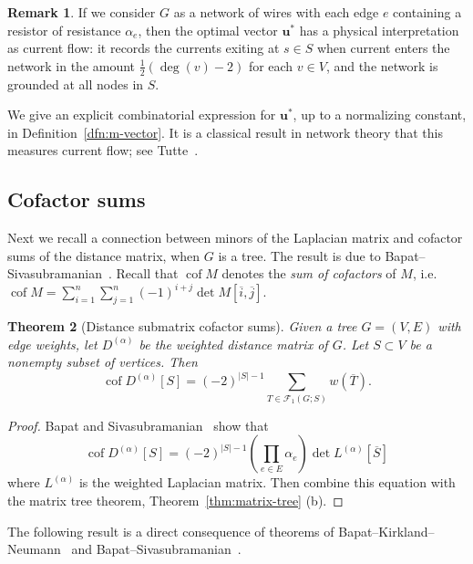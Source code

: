\documentclass{amsart}
\newtheorem{thm}{Theorem}[section]
\theoremstyle{definition}
\newtheorem{rmk}[thm]{Remark}
\newcommand{\boldm}{\mathbf{m}}
\newcommand{\boldu}{\mathbf{u}}
\newcommand{\Da}{{D^{(\alpha)}}}
\newcommand{\La}{L^{(\alpha)}}
\DeclareMathOperator{\cof}{cof}
\newcommand{\trees}{\mathcal{F}_1}
\begin{document}
\begin{rmk}
If we consider $G$ as a network of wires with each edge $e$ containing a resistor of resistance $\alpha_e$,
then the optimal vector $\boldu^*$
has a physical interpretation as current flow: 
it records the currents exiting at $s \in S$
when current enters the network in the amount $\frac{1}{2}(\deg(v) - 2)$
for each $v \in V$,
and the network is grounded at all nodes in $S$.

We give an explicit combinatorial expression for $\boldu^*$, up to a normalizing constant, in Definition~\ref{dfn:m-vector}.
It is a classical result in network theory that this measures current flow; see Tutte~\cite[Section VI.6]{tutte}.
\end{rmk}

\subsection{Cofactor sums}

Next we recall a connection between minors of the Laplacian matrix and cofactor sums of the distance matrix, when $G$ is a tree.
The result is due to Bapat--Sivasubramanian~\cite{bapat-sivasubramanian}.
Recall that $\cof M$ denotes the {\em sum of cofactors} of $M$, i.e. 
$\displaystyle
	\cof M = \sum_{i = 1}^{n} \sum_{j = 1}^{n} (-1)^{i + j} \det M[\overline{i},\overline{j}].
$

\begin{thm}[Distance submatrix cofactor sums]
\label{thm:distance-sub-cof}
Given a tree $G = (V, E)$ with edge weights,
let $\Da$ be the weighted distance matrix of $G$.
Let $S \subset V$ be a nonempty subset of vertices. 
Then
\begin{equation}
	\cof \Da[S] = (-2)^{|S|-1} \sum_{T \in \trees(G; S)} w(\overline{T}).
\end{equation}
\end{thm}
\begin{proof}
Bapat and Sivasubramanian~\cite[Theorem 11]{bapat-sivasubramanian}
show that
\[
	\cof \Da[S] = (-2)^{|S|-1} \left( \prod_{e \in E} \alpha_e \right) \det \La[\overline S] 
\]
where $\La$ is the weighted Laplacian matrix.
Then combine this equation with the matrix tree theorem,
Theorem~\ref{thm:matrix-tree} (b).
\end{proof}

The following result is a direct consequence of theorems of Bapat--Kirkland--Neumann~\cite{bapat-kirkland-neumann} and Bapat--Sivasubramanian~\cite{bapat-sivasubramanian}.
\end{document}
